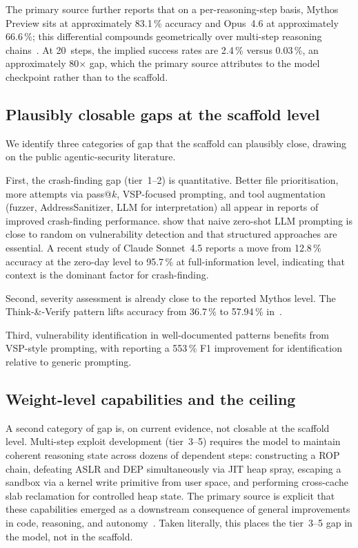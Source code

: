 \documentclass[11pt,a4paper]{article}
\begin{document}
The primary source further reports that on a per-reasoning-step basis,
Mythos Preview sits at approximately 83.1\,\% accuracy and Opus~4.6 at
approximately 66.6\,\%; this differential compounds geometrically over
multi-step reasoning chains~\citep{anthropicMythos2026,semgrepNeedles2026}.
At 20~steps, the implied success rates are 2.4\,\% versus 0.03\,\%,
an approximately 80$\times$ gap, which the primary source attributes to
the model checkpoint rather than to the scaffold.

\subsection{Plausibly closable gaps at the scaffold level}

We identify three categories of gap that the scaffold can plausibly
close, drawing on the public agentic-security literature.

First, the crash-finding gap (tier~1--2) is quantitative. Better file
prioritisation, more attempts via pass@$k$, VSP-focused prompting, and
tool augmentation (fuzzer, AddressSanitizer, LLM for interpretation) all
appear in reports of improved crash-finding performance.
\citet{ndss2025} show that naive zero-shot LLM prompting is close to
random on vulnerability detection and that structured approaches are
essential. A recent study of Claude Sonnet~4.5 reports a move from
12.8\,\% accuracy at the zero-day level to 95.7\,\% at full-information
level, indicating that context is the dominant factor for crash-finding.

Second, severity assessment is already close to the reported Mythos level.
The Think-\&-Verify pattern lifts accuracy from 36.7\,\% to 57.94\,\%
in~\citet{vulnSage2025}.

Third, vulnerability identification in well-documented patterns benefits
from VSP-style prompting, with \citet{vsp2024} reporting a 553\,\% F1
improvement for identification relative to generic prompting.

\subsection{Weight-level capabilities and the ceiling}

A second category of gap is, on current evidence, not closable at the
scaffold level. Multi-step exploit development (tier~3--5) requires the
model to maintain coherent reasoning state across dozens of dependent
steps: constructing a ROP chain, defeating ASLR and DEP simultaneously via
JIT heap spray, escaping a sandbox via a kernel write primitive from user
space, and performing cross-cache slab reclamation for controlled heap
state. The primary source is explicit that these capabilities emerged as
a downstream consequence of general improvements in code, reasoning, and
autonomy~\citep{anthropicGlasswing2026}. Taken literally, this places the
tier~3--5 gap in the model, not in the scaffold.
\end{document}

